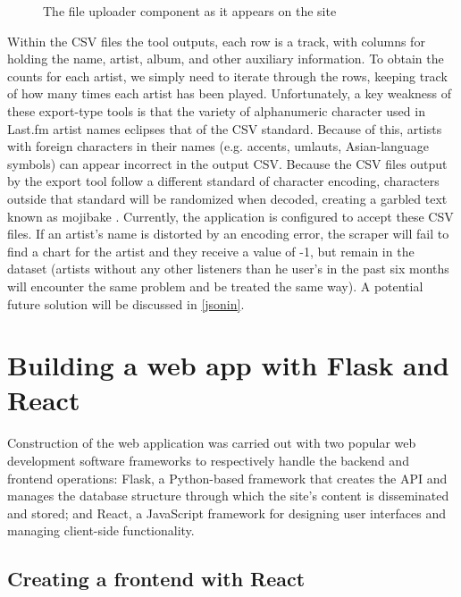 \begin{figure}[!ht]
	\begin{center}
		\caption{The file uploader component as it appears on the site}\label{upload}
	\end{center}
\end{figure}

Within the CSV files the tool outputs, each row is a track, with columns for holding the name, artist, album, and other auxiliary information. To obtain the counts for each artist, we simply need to iterate through the rows, keeping track of how many times each artist has been played. Unfortunately, a key weakness of these export-type tools is that the variety of alphanumeric character used in Last.fm artist names eclipses that of the CSV standard. Because of this, artists with foreign characters in their names (e.g. accents, umlauts, Asian-language symbols) can appear incorrect in the output CSV. Because the CSV files output by the export tool follow a different standard of character encoding, characters outside that standard will be randomized when decoded, creating a garbled text known as mojibake \cite{lamiraud_mojibake_2023}. Currently, the application is configured to accept these CSV files. If an artist's name is distorted by an encoding error, the scraper will fail to find a chart for the artist and they receive a value of -1, but remain in the dataset (artists without any other listeners than he user's in the past six months will encounter the same problem and be treated the same way). A potential future solution will be discussed in \autoref{jsonin}.

\section{Building a web app with Flask and React}

Construction of the web application was carried out with two popular web development software frameworks to respectively handle the backend and frontend operations: Flask, a Python-based framework that creates the API and manages the database structure through which the site's content is disseminated and stored; and React, a JavaScript framework for designing user interfaces and managing client-side functionality.

\subsection{Creating a frontend with React}

